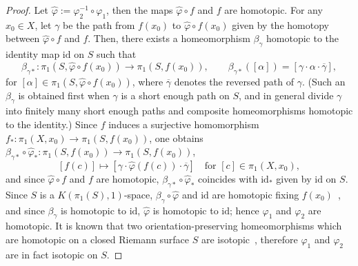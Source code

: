 \documentclass[11pt]{article}
\theoremstyle{definition}
\numberwithin{equation}{section}
\renewcommand{\a}{\alpha}
\renewcommand{\b}{\beta}
\newcommand{\g}{\gamma}
\newcommand{\f}{\varphi}
\newcommand*\id{\mathrm{id}}
\newcommand*\wbar{\overline}
\newcommand*\wh{\widehat}
\begin{document}
\begin{proof}
Let $\wh \f:=\f_2^{-1}\circ \f_1$, then the maps $\wh \f \circ f$ and $f$ are homotopic. For any $x_0 \in X$, let $\g$ be the path from $f(x_0)$ to $\wh \f \circ f(x_0)$ given by the homotopy between $\wh \f \circ f$ and $f$. Then, there exists a homeomorphism $\b_\g$ homotopic to the identity map $\id$ on $S$ such that
\[
\b_{\g \ast}:\pi_1\left(S, \wh \f \circ f(x_0)\right) \to \pi_1(S, f(x_0)), \qquad \b_{\g \ast}([\a])=[\g \cdot \a \cdot \wbar \g],
\]
for $[\a] \in \pi_1(S, \wh \f \circ f(x_0))$, where $\wbar \g$ denotes the reversed path of $\g$. (Such an $\b_\g$ is obtained first when $\g$ is a short enough path on $S$, and in general divide $\g$ into finitely many short enough paths and composite homeomorphisms homotopic to the identity.) Since $f$ induces a surjective homomorphism $f_\ast: \pi_1(X, x_0) \to \pi_1(S, f(x_0))$, one obtains $\b_{\g \ast} \circ \wh \f_\ast: \pi_1(S, f(x_0)) \to \pi_1(S, f(x_0))$,
\[
[f(c)] \mapsto \left[\g \cdot \wh \f (f(c)) \cdot \wbar \g\right] \quad \text{for }[c] \in \pi_1(X, x_0),
\]
and since $\wh \f \circ f$ and $f$ are homotopic, $\b_{\g \ast} \circ \wh \f_\ast$ coincides with $\id_\ast$ given by $\id$ on $S$. Since $S$ is a $K(\pi_1(S), 1)$-space, $\b_\g \circ \widehat \f$ and $\id$ are homotopic fixing $f(x_0)$~\cite[Proposition~1B.9]{Hatcher}, and since $\b_\g$ is homotopic to $\id$, $\widehat \f$ is homotopic to $\id$; hence $\f_1$ and $\f_2$ are homotopic. It is known that two orientation-preserving homeomorphisms which are homotopic on a closed Riemann surface $S$ are isotopic~\cite[Theorem~6.3]{Epstein-isotopies}, therefore $\f_1$ and $\f_2$ are in fact isotopic on $S$.
\end{proof}
\end{document}
